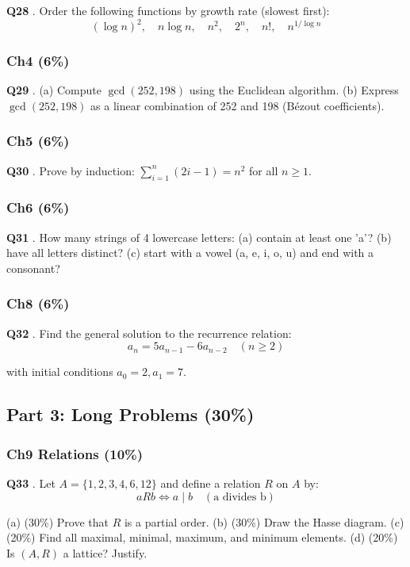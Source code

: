 \documentclass[10pt,a4paper,openany]{ctexbook}
\theoremstyle{definition}
\theoremstyle{remark}
\begin{document}
\textbf{Q28} . Order the following functions by growth rate (slowest first):
\[
(\log n)^2,\quad n\log n,\quad n^2,\quad 2^n,\quad n!,\quad n^{1/\log n}
\]

\subsubsection{Ch4 (6\%)}

\textbf{Q29} . (a) Compute $\gcd(252, 198)$ using the Euclidean algorithm.
(b) Express $\gcd(252, 198)$ as a linear combination of 252 and 198 (Bézout coefficients).
\subsubsection{Ch5 (6\%)}

\textbf{Q30} . Prove by induction: $\sum_{i=1}^{n} (2i - 1) = n^2$ for all $n \ge 1$.
\subsubsection{Ch6 (6\%)}

\textbf{Q31} . How many strings of 4 lowercase letters:
(a) contain at least one 'a'?
(b) have all letters distinct?
(c) start with a vowel (a, e, i, o, u) and end with a consonant?
\subsubsection{Ch8 (6\%)}

\textbf{Q32} . Find the general solution to the recurrence relation:
\[
a_n = 5a_{n-1} - 6a_{n-2} \quad (n \ge 2)
\]

with initial conditions $a_0 = 2, a_1 = 7$.
\vspace{-2pt}

\subsection{Part 3: Long Problems (30\%)}

\subsubsection{Ch9 Relations (10\%)}

\textbf{Q33} . Let $A = \{1, 2, 3, 4, 6, 12\}$ and define a relation $R$ on $A$ by:
\[
a R b \iff a \mid b \quad (\text{a divides b})
\]

(a) (30\%) Prove that $R$ is a partial order.
(b) (30\%) Draw the Hasse diagram.
(c) (20\%) Find all maximal, minimal, maximum, and minimum elements.
(d) (20\%) Is $(A, R)$ a lattice? Justify.
\end{document}
